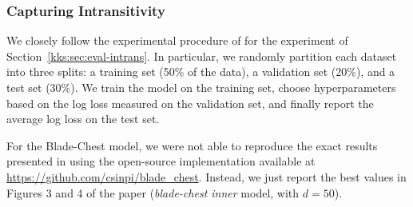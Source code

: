 
\subsubsection{Capturing Intransitivity}
\label{kks:app:intrans}

We closely follow the experimental procedure of \citet{chen2016modeling} for the experiment of Section~\ref{kks:sec:eval-intrans}.
In particular, we randomly partition each dataset into three splits: a training set (\num{50}\% of the data), a validation set (\num{20}\%), and a test set (\num{30}\%).
We train the model on the training set, choose hyperparameters based on the log loss measured on the validation set, and finally report the average log loss on the test set.

For the Blade-Chest model, we were not able to reproduce the exact results presented in \citet{chen2016modeling} using the open-source implementation available at \url{https://github.com/csinpi/blade_chest}.
Instead, we just report the best values in Figures 3 and 4 of the paper (\emph{blade-chest inner} model, with $d = 50$).


